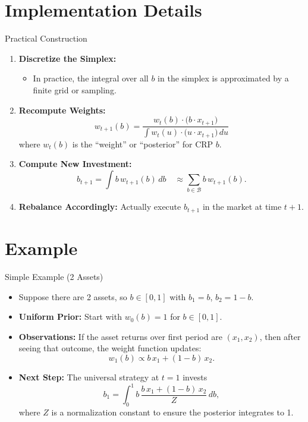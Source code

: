 \documentclass{beamer}
\begin{document}
\section{Implementation Details}
\begin{frame}{Practical Construction}
  \begin{enumerate}
    \item \textbf{Discretize the Simplex:}
      \begin{itemize}
        \item In practice, the integral over all \(b\) in the simplex is approximated by a finite grid or sampling.
      \end{itemize}
    \item \textbf{Recompute Weights:}
      \[
        w_{t+1}(b) = \frac{w_t(b)\cdot \bigl(b \cdot x_{t+1}\bigr)}{\int w_t(u)\cdot \bigl(u \cdot x_{t+1}\bigr)\,du}
      \]
      where \(w_t(b)\) is the “weight” or “posterior” for CRP \(b\).
    \item \textbf{Compute New Investment:}
      \[
        b_{t+1} = \int b \, w_{t+1}(b)\,db \quad \approx \sum_{b \in \mathcal{B}} b \, w_{t+1}(b).
      \]
    \item \textbf{Rebalance Accordingly:} Actually execute \(b_{t+1}\) in the market at time \(t+1\).
  \end{enumerate}
\end{frame}

\section{Example}
\begin{frame}{Simple Example (2 Assets)}
  \begin{itemize}
    \item Suppose there are 2 assets, so \(b \in [0,1]\) with \(b_1 = b\), \(b_2 = 1-b\).
    \item \textbf{Uniform Prior:} Start with \(w_0(b) = 1\) for \(b \in [0,1]\).
    \item \textbf{Observations:} If the asset returns over first period are \((x_1, x_2)\), then after seeing 
          that outcome, the weight function updates:
      \[
        w_1(b) \propto b \, x_1 + (1-b) \, x_2.
      \]
    \item \textbf{Next Step:} The universal strategy at \(t=1\) invests
      \[
        b_1 = \int_0^1 b \,\frac{b \, x_1 + (1-b) \, x_2}{Z} \, db,
      \]
      where \(Z\) is a normalization constant to ensure the posterior integrates to 1.
  \end{itemize}
\end{frame}
\end{document}
